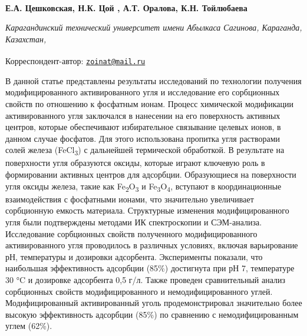 
\begin{articleheader}

{\bfseries
Е.А. Цешковская\authorid,
Н.К. Цой\textsuperscript{\envelope } \authorid,
А.Т. Оралова\authorid,
К.Н. Тойлюбаева\authorid}
\end{articleheader}

\begin{affiliation}
\emph{Карагандинский технический университет имени Абылкаса Сагинова, Караганда, Казахстан,}

\raggedright \textsuperscript{\envelope }Корреспондент-автор: \href{mailto:zoinat@mail.ru}{\nolinkurl{zoinat@mail.ru}}
\end{affiliation}

В данной статье представлены результаты исследований по технологии
получения модифицированного активированного угля и исследование его
сорбционных свойств по отношению к фосфатным ионам. Процесс химической
модификации активированного угля заключался в нанесении на его
поверхность активных центров, которые обеспечивают избирательное
связывание целевых ионов, в данном случае фосфатов. Для этого
использована пропитка угля растворами солей железа
(FeCl\textsubscript{3}) с дальнейшей термической обработкой. В
результате на поверхности угля образуются оксиды, которые играют
ключевую роль в формировании активных центров для адсорбции.
Образующиеся на поверхности угля оксиды железа, такие как
Fe\textsubscript{2}O\textsubscript{3} и
Fe\textsubscript{3}O\textsubscript{4}, вступают в координационные
взаимодействия с фосфатными ионами, что значительно увеличивает
сорбционную емкость материала. Структурные изменения модифицированного
угля были подтверждены методами ИК спектроскопии и СЭМ-анализа.
Исследование сорбционных свойств полученного модифицированного
активированного угля проводилось в различных условиях, включая
варьирование рН, температуры и дозировки адсорбента. Эксперименты
показали, что наибольшая эффективность адсорбции (85\%) достигнута при
рН 7, температуре 30 °C и дозировке адсорбента 0,5 г/л. Также проведен
сравнительный анализ сорбционных свойств модифицированного и
немодифицированного углей. Модифицированный активированный уголь
продемонстрировал значительно более высокую эффективность адсорбции
(85\%) по сравнению с немодифицированным углем (62\%).

